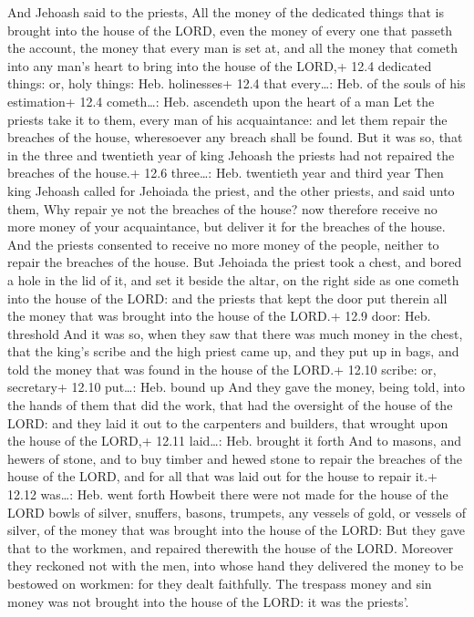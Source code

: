  And Jehoash said to the priests, All the money of the
dedicated things that is brought into the house of the LORD, even the
money of every one that passeth the account, the money that every man is
set at, and all the money that cometh into any man's heart to bring into
the house of the LORD,+ 12.4 dedicated things: or, holy things: Heb.
holinesses+ 12.4 that every\ldots: Heb. of the souls of his estimation+
12.4 cometh\ldots: Heb. ascendeth upon the heart of a man 
Let the priests take it to them, every man of his acquaintance: and let
them repair the breaches of the house, wheresoever any breach shall be
found.  But it was so, that in the three and twentieth year
of king Jehoash the priests had not repaired the breaches of the house.+
12.6 three\ldots: Heb. twentieth year and third year  Then
king Jehoash called for Jehoiada the priest, and the other priests, and
said unto them, Why repair ye not the breaches of the house? now
therefore receive no more money of your acquaintance, but deliver it for
the breaches of the house.  And the priests consented to
receive no more money of the people, neither to repair the breaches of
the house.  But Jehoiada the priest took a chest, and bored
a hole in the lid of it, and set it beside the altar, on the right side
as one cometh into the house of the LORD: and the priests that kept the
door put therein all the money that was brought into the house of the
LORD.+ 12.9 door: Heb. threshold  And it was so, when they
saw that there was much money in the chest, that the king's scribe and
the high priest came up, and they put up in bags, and told the money
that was found in the house of the LORD.+ 12.10 scribe: or, secretary+
12.10 put\ldots: Heb. bound up  And they gave the money,
being told, into the hands of them that did the work, that had the
oversight of the house of the LORD: and they laid it out to the
carpenters and builders, that wrought upon the house of the LORD,+ 12.11
laid\ldots: Heb. brought it forth  And to masons, and
hewers of stone, and to buy timber and hewed stone to repair the
breaches of the house of the LORD, and for all that was laid out for the
house to repair it.+ 12.12 was\ldots: Heb. went forth 
Howbeit there were not made for the house of the LORD bowls of silver,
snuffers, basons, trumpets, any vessels of gold, or vessels of silver,
of the money that was brought into the house of the LORD: 
But they gave that to the workmen, and repaired therewith the house of
the LORD.  Moreover they reckoned not with the men, into
whose hand they delivered the money to be bestowed on workmen: for they
dealt faithfully.  The trespass money and sin money was not
brought into the house of the LORD: it was the priests'.

